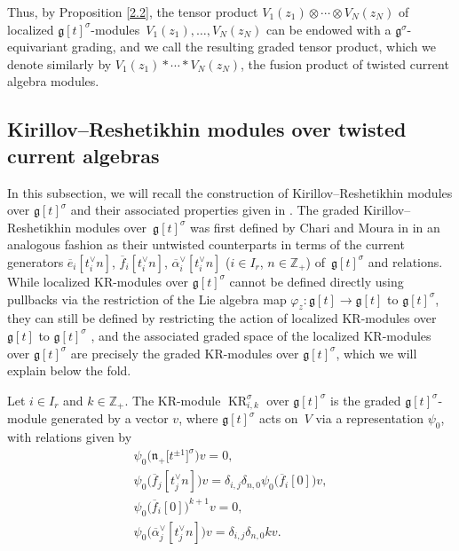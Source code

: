 \documentclass[pdftex]{sigma}
\numberwithin{equation}{section}
\DeclareMathOperator{\KR}{KR}
\begin{document}
Thus, by Proposition \ref{2.2}, the tensor product $V_1(z_1)\otimes\cdots\otimes V_N(z_N)$ of localized $\mathfrak{g}[t]^{\sigma}$-modules~${V_1(z_1),\dots,V_N(z_N)}$ can be endowed with a $\mathfrak{g}^{\sigma}$-equivariant grading, and we call the resulting graded tensor product, which we denote similarly by $V_1(z_1)*\cdots*V_N(z_N)$, the fusion product of twisted current algebra modules.

\subsection{Kirillov--Reshetikhin modules over twisted current algebras}\label{Section 2.5}

In this subsection, we will recall the construction of Kirillov--Reshetikhin modules over $\mathfrak{g}[t]^{\sigma}$ and their associated properties given in \cite{CM06, CM07, KV16}. The graded Kirillov--Reshetikhin modules over~$\mathfrak{g}[t]^{\sigma}$ was first defined by Chari and Moura in \cite{CM06, CM07} in an analogous fashion as their untwisted counterparts in terms of the current generators $\overline{e}_i[t_i^{\vee}n]$, $\overline{f}_i[t_i^{\vee}n]$, $\overline{\alpha}_i^{\vee}[t_i^{\vee}n]$ ($i\in I_r$, $n\in\mathbb{Z}_+$) of~$\mathfrak{g}[t]^{\sigma}$ and relations. While localized KR-modules over $\mathfrak{g}[t]^{\sigma}$ cannot be defined directly using pullbacks via the restriction of the Lie algebra map $\varphi_z\colon \mathfrak{g}[t]\to\mathfrak{g}[t]$ to $\mathfrak{g}[t]^{\sigma}$, they can still be defined by restricting the action of localized KR-modules over $\mathfrak{g}[t]$ to $\mathfrak{g}[t]^{\sigma}$ \cite[Section 6.5]{KV16}, and the associated graded space of the localized KR-modules over $\mathfrak{g}[t]^{\sigma}$ are precisely the graded KR-modules over $\mathfrak{g}[t]^{\sigma}$, which we will explain below the fold.

\begin{Definition}\label{2.3}
Let $i\in I_r$ and $k\in\mathbb{Z}_+$. The KR-module $\KR_{i,k}^{\sigma}$ over $\mathfrak{g}[t]^{\sigma}$ is the graded $\mathfrak{g}[t]^{\sigma}$-module generated by a vector $v$, where $\mathfrak{g}[t]^{\sigma}$ acts on~$V$ via a representation $\psi_0$, with relations given by
\begin{subequations}\label{eq:2.4}
\begin{gather}
\psi_0\bigl(\mathfrak{n}_+\bigl[t^{\pm1}\bigr]^{\sigma}\bigr)v =0,\\
\psi_0\bigl(\overline{f}_j[t_j^{\vee}n]\bigr)v =\delta_{i,j}\delta_{n,0}\psi_0\bigl(\overline{f}_i[0]\bigr)v,\label{eq:2.4b}\\
\psi_0\bigl(\overline{f}_i[0]\bigr)^{k+1}v =0,\\
\psi_0\bigl(\overline{\alpha}_j^{\vee}[t_j^{\vee}n]\bigr)v =\delta_{i,j}\delta_{n,0}kv.
\end{gather}
\end{subequations}
\end{Definition}
\end{document}
